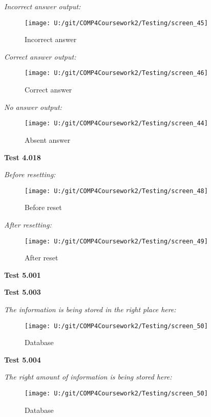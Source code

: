 \textit{Incorrect answer output: }

\begin{figure}[H]
    \label{fig: Second Screen}\caption{Incorrect answer}
    \texttt{[image: U:/git/COMP4Coursework2/Testing/screen\_45]}
\end{figure}

\textit{Correct answer output: }

\begin{figure}[H]
    \label{fig: Second Screen}\caption{Correct answer}
    \texttt{[image: U:/git/COMP4Coursework2/Testing/screen\_46]}
\end{figure}

\textit{No answer output: }

\begin{figure}[H]
    \label{fig: Second Screen}\caption{Absent answer}
    \texttt{[image: U:/git/COMP4Coursework2/Testing/screen\_44]}
\end{figure}

\textbf{Test 4.018}

\textit{Before resetting: }

\begin{figure}[H]
    \label{fig: Second Screen}\caption{Before reset}
    \texttt{[image: U:/git/COMP4Coursework2/Testing/screen\_48]}
\end{figure}

\textit{After resetting: }

\begin{figure}[H]
    \label{fig: Second Screen}\caption{After reset}
    \texttt{[image: U:/git/COMP4Coursework2/Testing/screen\_49]}
\end{figure}

\textbf{Test 5.001}

\textbf{Test 5.003}

\textit{The information is being stored in the right place here: }

\begin{figure}[H]
    \label{fig: Second Screen}\caption{Database}
    \texttt{[image: U:/git/COMP4Coursework2/Testing/screen\_50]}
\end{figure}

\textbf{Test 5.004}

\textit{The right amount of information is being stored here: }

\begin{figure}[H]
    \label{fig: Second Screen}\caption{Database}
    \texttt{[image: U:/git/COMP4Coursework2/Testing/screen\_50]}
\end{figure}

